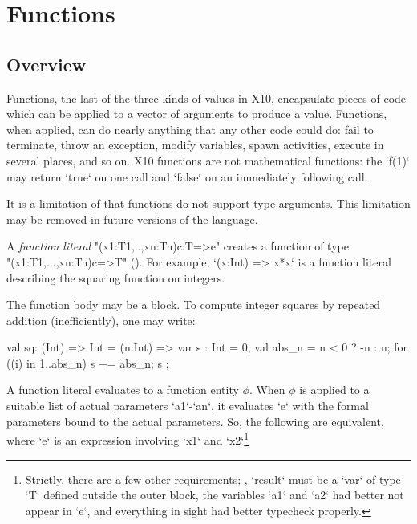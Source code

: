 \chapter{Functions}
\label{Functions}
\label{functions}
\label{Closures}

\section{Overview}
Functions, the last of the three kinds of values in X10, encapsulate pieces of
code which can be applied to a vector of arguments to produce a value.
Functions, when applied, can do nearly anything that any other code could do:
fail to terminate, throw an exception, modify variables, spawn activities,
execute in several places, and so on. X10 functions are not mathematical
functions: the \xcd`f(1)` may return \xcd`true` on one call and \xcd`false` on
an immediately following call.

It is a limitation of \XtenCurrVer{} that functions do not support
type arguments. This limitation may be removed in future versions of
the language.

A \emph{function literal} \xcd"(x1:T1,..,xn:Tn){c}:T=>e" creates a function of
type\\ \xcd"(x1:T1,...,xn:Tn){c}=>T" ().  For example, 
\xcd`(x:Int) => x*x` is a function literal describing the squaring function on
integers.   


The function body may be a block.  To compute integer squares by repeated
addition (inefficiently), one may write: 
\begin{xten}
val sq: (Int) => Int 
      = (n:Int) => {
           var s : Int = 0;
           val abs_n = n < 0 ? -n : n;
           for ((i) in 1..abs_n) s += abs_n;
           s
        };
\end{xten}




A function literal evaluates to a function entity {$\phi$}. When {$\phi$} is
applied to a suitable list of actual parameters \xcd`a1`-\xcd`an`, it
evaluates \xcd`e` with the formal parameters bound to the actual parameters.
So, the following are equivalent, where \xcd`e` is an expression involving
\xcd`x1` and \xcd`x2`\footnote{Strictly, there are a few other requirements;
  \eg, \xcd`result` must be a \xcd`var` of type \xcd`T` defined outside the
  outer block, the variables \xcd`a1` and \xcd`a2` had better not appear in
  \xcd`e`, and everything in sight had better typecheck properly.}

